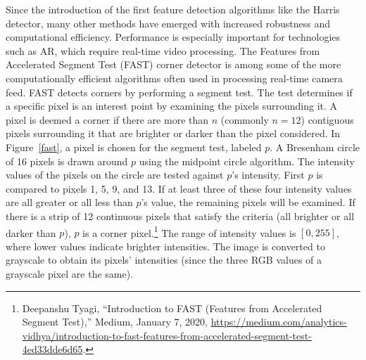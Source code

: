 Since the introduction of the first feature detection algorithms like the Harris detector, many other methods have emerged with increased robustness and computational efficiency. Performance is especially important for technologies such as AR, which require real-time video processing. The Features from Accelerated Segment Test (FAST) corner detector is among some of the more computationally efficient algorithms often used in processing real-time camera feed. FAST detects corners by performing a segment test. The test determines if a specific pixel is an interest point by examining the pixels surrounding it. A pixel is deemed a corner if there are more than $n$ (commonly $n = 12$) contiguous pixels surrounding it that are brighter or darker than the pixel considered. In Figure~\ref{fast}, a pixel is chosen for the segment test, labeled $p$. A Bresenham circle of 16 pixels is drawn around $p$ using the midpoint circle algorithm. The intensity values of the pixels on the circle are tested against $p$'s intensity. First $p$ is compared to pixels 1, 5, 9, and 13.  If at least three of these four intensity values are all greater or all less than $p$'s value, the remaining pixels will be examined. If there is a strip of 12 continuous pixels that satisfy the criteria (all brighter or all darker than $p$), $p$ is a corner pixel.\footnote{Deepanshu Tyagi, “Introduction to FAST (Features from Accelerated Segment Test),” Medium, January 7, 2020, \url{https://medium.com/analytics-vidhya/introduction-to-fast-features-from-accelerated-segment-test-4ed33dde6d65}.} The range of intensity values is $[0, 255]$, where lower values indicate brighter intensities. The image is converted to grayscale to obtain its pixels' intensities (since the three RGB values of a grayscale pixel are the same).

\begin{figure}[!ht]
\end{figure}

